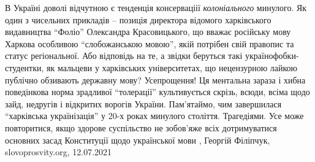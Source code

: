 В Україні доволі відчутною є тенденція консерваціії \emph{колоніального} минулого. Як
один з чисельних прикладів – позиція директора відомого харківського
видавництва \enquote{Фоліо} Олександра Красовицького, що вважає російську мову Харкова
особливою \enquote{слобожанською мовою}, якій потрібен свій правопис та статус
регіональної. Або відповідь на те, а звідки беруться такі
українофобки-студентки, як мальцеви у харківських університетах, що нецензурною
лайкою публічно обзивають державну мову? Усепрощення! Ця ментальна зараза і
хибна поведінкова норма зрадливої \enquote{толерації} культивується скрізь, всюди,
всіма щодо зайд, недругів і відкритих ворогів України. Пам’ятаймо, чим
завершилася \enquote{харківська українізація} у 20-х роках минулого століття.
Трагедіями. Усе може повторитися, якщо здорове суспільство не зобов’яже всіх
дотримуватися основних засад Конституції щодо української мови
, Георгій Філіпчук, slovoprosvity.org, 12.07.2021
